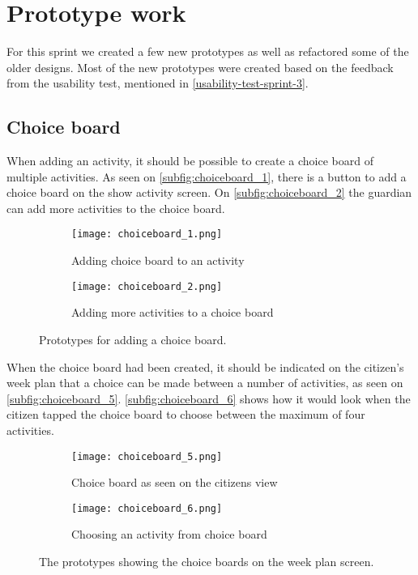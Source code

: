  \section{Prototype work}
For this sprint we created a few new prototypes as well as refactored some of the older designs. 
Most of the new prototypes were created based on the feedback from the usability test, mentioned in \autoref{usability-test-sprint-3}.

\subsection{Choice board}
When adding an activity, it should be possible to create a choice board of multiple activities. 
As seen on \autoref{subfig:choiceboard_1}, there is a button to add a choice board on the show activity screen. 
On \autoref{subfig:choiceboard_2} the guardian can add more activities to the choice board.
\begin{figure}[H]
    \begin{subfigure}{0.5\textwidth}
    \texttt{[image: choiceboard\_1.png]}
    \caption{Adding choice board to an activity}
    \label{subfig:choiceboard_1}
    \end{subfigure}
    \begin{subfigure}{0.5\textwidth}
    \texttt{[image: choiceboard\_2.png]}
    \caption{Adding more activities to a choice board}
    \label{subfig:choiceboard_2}
    \end{subfigure} 
    \caption{Prototypes for adding a choice board.}
    \label{fig:choiceboardadd}
\end{figure}
\noindent
When the choice board had been created, it should be indicated on the citizen's week plan that a choice can be made between a number of activities, as seen on \autoref{subfig:choiceboard_5}.
\autoref{subfig:choiceboard_6} shows how it would look when the citizen tapped the choice board to choose between the maximum of four activities.
\begin{figure}[H]
    \begin{subfigure}{0.5\textwidth}
    \texttt{[image: choiceboard\_5.png]}
    \caption{Choice board as seen on the citizens view}
    \label{subfig:choiceboard_5}
    \end{subfigure}
    \begin{subfigure}{0.5\textwidth}
        \texttt{[image: choiceboard\_6.png]}
    \caption{Choosing an activity from choice board}
    \label{subfig:choiceboard_6}
    \end{subfigure} 
    \caption{The prototypes showing the choice boards on the week plan screen.}
    \label{fig:choiceboardcitizen}
\end{figure}

